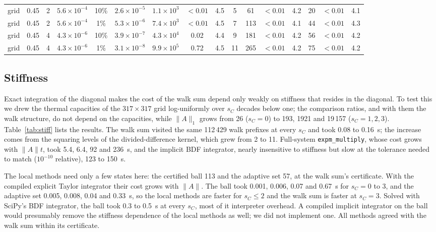 \documentclass[aps,pra,superscriptaddress,floatfix,longbibliography,twocolumn]{revtex4-2}
\begin{document}
\begin{table}[t]
\begin{ruledtabular}
\begin{tabular}{lcccc|cccc|cccc|ccc}
grid & 0.45 & 2 & $5.6\times10^{-4}$ & 10\% & $2.6\times10^{-5}$ & $1.1\times10^{3}$ & $<0.01$ & 4.5 & 5 & 61 & $<0.01$ & 4.2 & 20 & $<0.01$ & 4.1 \\
grid & 0.45 & 2 & $5.6\times10^{-4}$ & 1\% & $5.3\times10^{-6}$ & $7.4\times10^{3}$ & $<0.01$ & 4.5 & 7 & 113 & $<0.01$ & 4.1 & 44 & $<0.01$ & 4.3 \\
grid & 0.45 & 4 & $4.3\times10^{-6}$ & 10\% & $3.9\times10^{-7}$ & $4.3\times10^{4}$ & 0.02 & 4.4 & 9 & 181 & $<0.01$ & 4.2 & 56 & $<0.01$ & 4.2 \\
grid & 0.45 & 4 & $4.3\times10^{-6}$ & 1\% & $3.1\times10^{-8}$ & $9.9\times10^{5}$ & 0.72 & 4.5 & 11 & 265 & $<0.01$ & 4.2 & 75 & $<0.01$ & 4.2 \\
\end{tabular}
\end{ruledtabular}
\end{table}


\subsection{Stiffness}\label{sec:stiff}
Exact integration of the diagonal makes the cost of the walk sum depend only weakly on stiffness that resides in the diagonal. To test this we drew the thermal capacities of the $317\times317$ grid log-uniformly over $s_C$ decades below one; the comparison ratios, and with them the walk structure, do not depend on the capacities, while $\|A\|_1$ grows from 26 ($s_C=0$) to 193, 1921 and 19\,157 ($s_C=1,2,3$). Table~\ref{tab:stiff} lists the results. The walk sum visited the same 112\,429 walk prefixes at every $s_C$ and took 0.08 to 0.16~s; the increase comes from the squaring levels of the divided-difference kernel, which grew from 2 to 11. Full-system \texttt{expm\_multiply}, whose cost grows with $\|A\|t$, took 5.4, 6.4, 92 and 236~s, and the implicit BDF integrator, nearly insensitive to stiffness but slow at the tolerance needed to match ($10^{-10}$ relative), 123 to 150~s.

The local methods need only a few states here: the certified ball 113 and the adaptive set 57, at the walk sum's certificate. With the compiled explicit Taylor integrator their cost grows with $\|A\|$. The ball took 0.001, 0.006, 0.07 and 0.67~s for $s_C=0$ to 3, and the adaptive set 0.005, 0.008, 0.04 and 0.33~s, so the local methods are faster for $s_C\le2$ and the walk sum is faster at $s_C=3$. Solved with SciPy's BDF integrator, the ball took 0.3 to 0.5~s at every $s_C$, most of it interpreter overhead. A compiled implicit integrator on the ball would presumably remove the stiffness dependence of the local methods as well; we did not implement one. All methods agreed with the walk sum within its certificate.
\end{document}
